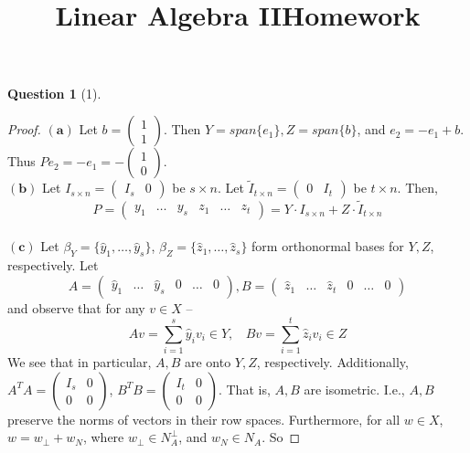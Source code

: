 \documentclass[11pt]{article}
\title{\vspace{-50pt}
\Huge \name
\\\vspace{20pt}
\huge Linear Algebra II\hfill Homework \hw}
\author{}
\date{}
\theoremstyle{quest}
\newtheorem*{question}{Question}
\begin{document}
\maketitle

\begin{question}[1]
\end{question}
\begin{proof}
$\mathbf{(a)}$ Let $b = \begin{pmatrix}
1 \\
1
\end{pmatrix}$. Then $Y = span \{e_1\}, Z = span \{b\}$, and $e_2 = -e_1 + b$. Thus $Pe_2 = -e_1 = - \begin{pmatrix}
1 \\
0
\end{pmatrix} $.
\\$\mathbf{(b)}$ Let $I_{s \times n} = \begin{pmatrix}
I_s & 0
\end{pmatrix} $ be $s \times n$. Let $\tilde{I}_{t \times n} = \begin{pmatrix}
0 & I_t
\end{pmatrix} $ be $t \times n$. Then,
$$P = \begin{pmatrix}
y_1 & \ldots & y_s & z_1 & \ldots & z_t
\end{pmatrix}  = Y \cdot I_{s \times n}  + Z \cdot \tilde{I}_{t \times n} $$
\\$\mathbf{(c)}$ Let $\beta_Y = \{\hat{y}_1, \ldots, \hat{y}_s\}$, $\beta_Z = \{\hat{z}_1, \ldots, \hat{z}_s\}$ form orthonormal bases for $Y, Z$, respectively. Let
$$A = \begin{pmatrix}
\hat{y}_1 & \ldots & \hat{y}_s & 0 & \ldots & 0
\end{pmatrix}, B = \begin{pmatrix}
\hat{z}_1 & \ldots & \hat{z}_t & 0 & \ldots & 0
\end{pmatrix} $$
and observe that for any $v \in X$ --
$$Av = \sum_{i=1}^s \hat{y}_i v_i \in Y,\ \ \ \ Bv = \sum_{i=1}^t \hat{z}_i v_i \in Z$$
We see that in particular, $A, B$ are onto $Y, Z$, respectively. Additionally,
\\$A^TA = \begin{pmatrix}
I_s & 0 \\
0 & 0
\end{pmatrix} $, $B^TB = \begin{pmatrix}
I_t & 0 \\
0 & 0
\end{pmatrix} $. That is, $A, B$ are isometric. I.e., $A, B$ preserve the norms of vectors in their row spaces. Furthermore, for all $w \in X$, $w = w_{\perp} + w_N$, where $w_{\perp} \in N_A^{\perp}$, and $w_N \in N_A$. So

\end{proof}
\end{document}
